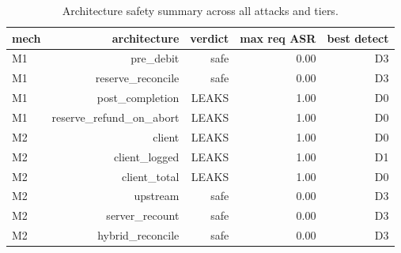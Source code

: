 \begin{table}[t]
\centering
\small
\caption{Architecture safety summary across all attacks and tiers.}
\label{tab:defense}
\begin{tabular}{lrrrr}
\toprule
mech & architecture & verdict & max req ASR & best detect \\
\midrule
M1 & pre\_debit & safe & 0.00 & D3 \\
M1 & reserve\_reconcile & safe & 0.00 & D3 \\
M1 & post\_completion & LEAKS & 1.00 & D0 \\
M1 & reserve\_refund\_on\_abort & LEAKS & 1.00 & D0 \\
M2 & client & LEAKS & 1.00 & D0 \\
M2 & client\_logged & LEAKS & 1.00 & D1 \\
M2 & client\_total & LEAKS & 1.00 & D0 \\
M2 & upstream & safe & 0.00 & D3 \\
M2 & server\_recount & safe & 0.00 & D3 \\
M2 & hybrid\_reconcile & safe & 0.00 & D3 \\
\bottomrule
\end{tabular}
\end{table}
